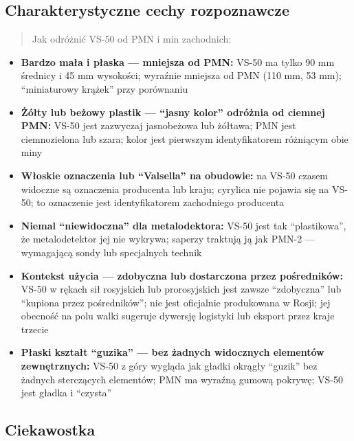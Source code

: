 \documentclass[12pt,oneside]{book}
\providecommand{\tightlist}{%
  \setlength{\itemsep}{0pt}\setlength{\parskip}{0pt}}
\begin{document}
\subsection{Charakterystyczne cechy
rozpoznawcze}\label{charakterystyczne-cechy-rozpoznawcze-134}

\begin{quote}
Jak odróżnić VS-50 od PMN i min zachodnich:
\end{quote}

\begin{itemize}
\tightlist
\item
  \textbf{Bardzo mała i płaska --- mniejsza od PMN:} VS-50 ma tylko 90
  mm średnicy i 45 mm wysokości; wyraźnie mniejsza od PMN (110 mm, 53
  mm); ``miniaturowy krążek'' przy porównaniu
\item
  \textbf{Żółty lub beżowy plastik --- ``jasny kolor'' odróżnia od
  ciemnej PMN:} VS-50 jest zazwyczaj jasnobeżowa lub żółtawa; PMN jest
  ciemnozielona lub szara; kolor jest pierwszym identyfikatorem
  różniącym obie miny
\item
  \textbf{Włoskie oznaczenia lub ``Valsella'' na obudowie:} na VS-50
  czasem widoczne są oznaczenia producenta lub kraju; cyrylica nie
  pojawia się na VS-50; to oznaczenie jest identyfikatorem zachodniego
  producenta
\item
  \textbf{Niemal ``niewidoczna'' dla metalodektora:} VS-50 jest tak
  ``plastikowa'', że metalodetektor jej nie wykrywa; saperzy traktują ją
  jak PMN-2 --- wymagającą sondy lub specjalnych technik
\item
  \textbf{Kontekst użycia --- zdobyczna lub dostarczona przez
  pośredników:} VS-50 w rękach sił rosyjskich lub prorosyjskich jest
  zawsze ``zdobyczna'' lub ``kupiona przez pośredników''; nie jest
  oficjalnie produkowana w Rosji; jej obecność na polu walki sugeruje
  dywersję logistyki lub eksport przez kraje trzecie
\item
  \textbf{Płaski kształt ``guzika'' --- bez żadnych widocznych elementów
  zewnętrznych:} VS-50 z góry wygląda jak gładki okrągły ``guzik'' bez
  żadnych sterczących elementów; PMN ma wyraźną gumową pokrywę; VS-50
  jest gładka i ``czysta''
\end{itemize}

\subsection{Ciekawostka}\label{ciekawostka-134}
\end{document}
